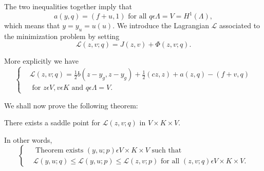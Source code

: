 The two inequalities together imply that
$$
a(y, q) = (f+u, 1) \text{ for all } q \epsilon \Lambda = V = H^{1}(\Lambda),
$$\pageoriginale
which means that $y = y_{u} = u(u)$. We introduce the Lagrangian $\mathscr{L}$ associated to the minimization problem by setting
\begin{equation*}
\mathscr{L} (z, v ; q) = J(z, v) + \Phi (z, v;q).\tag{1.8}\label{chap6-eq1.8}
\end{equation*}

More explicitly we have
\begin{equation*}
\begin{cases}
& \mathscr{L}(z, v ; q) = \frac{1}{2} b (z-y_{g}, z-y_{g}) + \frac{1}{2} (cz, z) + a(z, q) - (f + v, q)\\
& \text{ for } z \epsilon V, v \epsilon K \text{ and } q \epsilon \Lambda = V.\tag*{$(1.8)'$}\label{chyap6-eq1.8'}
\end{cases}
\end{equation*}

We shall now prove the following theorem:

\begin{theorem}\label{chap6-thm1.1}
There exists a saddle point for $\mathscr{L} (z, v ; q)$ in $V \times K \times V$.

In other words,
\begin{equation*}
\begin{cases}
& \text{ Theorem exists } (y, u ; p) \epsilon V \times K \times V \text{ such that }\\
& \mathscr{L} (y, u ; q) \leq \mathscr{L} (y, u ; p) \leq \mathscr{L} (z, v ; p) \text{ for all } (z, v ; q) \epsilon V \times K \times V.\tag{1.9}\label{chap6-eq1.9}
\end{cases}
\end{equation*}
\end{theorem}

